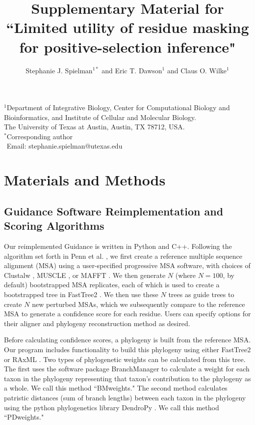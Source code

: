 \documentclass[11pt]{article}
\begin{document}
\title{\textbf{Supplementary Material for ``Limited utility of residue masking for positive-selection inference"}}
\author{Stephanie J. Spielman$^{1*}$ and Eric T. Dawson$^{1}$ and Claus O. Wilke$^{1}$}
\date{}
\maketitle
\noindent $^1$Department of Integrative Biology, Center for Computational Biology and Bioinformatics, and Institute of Cellular and Molecular Biology.
\\ The University of Texas at Austin, Austin, TX 78712, USA.\\

\bigskip
\noindent
$^*$Corresponding author\\
$\phantom{^*}$Email: stephanie.spielman@utexas.edu\\

\bigskip
\tableofcontents

\newpage 

\section{Materials and Methods}

\subsection*{Guidance Software Reimplementation and Scoring Algorithms}
Our reimplemented Guidance is written in Python and C++. Following the algorithm set forth in Penn et al. \citep{Penn2010}, we first create a reference multiple sequence alignment (MSA) using a user-specified progressive MSA software, with choices of Clustalw \citep{Thompson1994}, MUSCLE \citep{Edgar2004}, or MAFFT \citep{Katoh2002, Katoh2005}. We then generate $N$ (where $N=100$, by default) bootstrapped MSA replicates, each of which is used to create a bootstrapped tree in FastTree2 \citep{Price2010}. We then use these $N$ trees as guide trees to create $N$ new perturbed MSAs, which we subsequently compare to the reference MSA to generate a confidence score for each residue. Users can specify options for their aligner and phylogeny reconstruction method as desired.

Before calculating confidence scores, a phylogeny is built from the reference MSA. Our program includes functionality to build this phylogeny using either FastTree2 \citep{Price2010} or RAxML \citep{Stamatakis2006}. Two types of phylogenetic weights can be calculated from this tree. The first uses the software package BranchManager \citep{Stone2007} to calculate a weight for each taxon in the phylogeny representing that taxon's contribution to the phylogeny as a whole. We call this method ``BMweights." The second method calculates patristic distances (sum of branch lengths) between each taxon in the phylogeny using the python phylogenetics library DendroPy \citep{Sukumaran2010}. We call this method ``PDweights."
\end{document}
